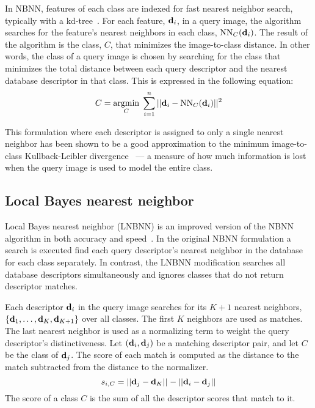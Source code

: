         In NBNN, features of each class are indexed for fast nearest neighbor search, typically with a
        kd-tree~\cite{bentley_multidimensional_1975}. For each feature, $\mathbf{d}_i$, in a query image, the algorithm
        searches for the feature's nearest neighbors in each class, $\operatorname{NN}_C(\mathbf{d}_i)$. The result of the
        algorithm is the class, $C$, that minimizes the image-to-class distance. In other words, the class of a
        query image is chosen by searching for the class that minimizes the total distance between each query
        descriptor and the nearest database descriptor in that class. This is expressed in the following equation:
        \begin{equation}
            C = \underset{C}{\operatorname{argmin}}\; \sum_{i=1}^n ||\mathbf{d}_i - \operatorname{NN}_C(\mathbf{d}_i)||^2
        \end{equation}

        This formulation where each descriptor is assigned to only a single nearest neighbor has been shown to be a
        good approximation to the minimum image-to-class Kullback-Leibler divergence~\cite{boiman_defense_2008} ---
        a measure of how much information is lost when the query image is used to model the entire class.

    \subsection{Local \naive{} Bayes nearest neighbor}\label{sec:lnbnn}  

        Local \naive{} Bayes nearest neighbor (LNBNN) is an improved version of the NBNN algorithm in both accuracy
        and speed~\cite{mccann_local_2012}. In the original NBNN formulation a search is executed find each query
        descriptor's nearest neighbor in the database for each class separately. In contrast, the LNBNN
        modification searches all database descriptors simultaneously and ignores classes that do not return
        descriptor matches.
        
        Each descriptor $\mathbf{d}_i$ in the query image searches for its $K+1$ nearest neighbors, %
        $\{\mathbf{d}_1, \ldots, \mathbf{d}_K, \mathbf{d}_{K + 1}\}$ over all classes.
        The first $K$ neighbors are used as matches.
        The last nearest neighbor is used as a normalizing term to weight the query descriptor's distinctiveness.
        Let $(\mathbf{d}_i, \mathbf{d}_j)$ be a matching descriptor pair, and let $C$ be the class of $\mathbf{d}_j$.
        The score of each match is computed as the distance to the match subtracted from the distance to the
          normalizer.
        \begin{equation}
            s_{i, C} = ||\mathbf{d}_j - \mathbf{d}_K||_{} - ||\mathbf{d}_i - \mathbf{d}_j||_{}
        \end{equation}
        The score of a class $C$ is the sum of all the descriptor scores that match to it.


